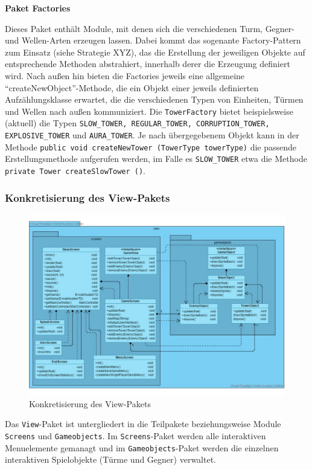 \documentclass[enabledeprecatedfontcommands,fontsize=12pt,paper=a4,twoside,parskip=half]{scrartcl}
\begin{document}
\textbf{Paket Factories}

Dieses Paket enthält Module, mit denen sich die verschiedenen Turm, Gegner- und Wellen-Arten erzeugen lassen. Dabei kommt das sogenante Factory-Pattern zum Einsatz (siehe Strategie XYZ), das die Erstellung der jeweiligen Objekte auf entsprechende Methoden abstrahiert, innerhalb derer die Erzeugung definiert wird. Nach außen hin bieten die Factories jeweils eine allgemeine \enquote{createNewObject}-Methode, die ein Objekt einer jeweils definierten  Aufzählungsklasse erwartet, die die verschiedenen Typen von Einheiten, Türmen und Wellen nach außen kommuniziert. Die \texttt{TowerFactory} bietet beispielsweise (aktuell) die Typen \texttt{SLOW\_TOWER, REGULAR\_TOWER, CORRUPTION\_TOWER, EXPLOSIVE\_TOWER} und  \texttt{AURA\_TOWER}. Je nach übergegebenem Objekt kann in der Methode \texttt{public void createNewTower (TowerType towerType)} die passende Erstellungsmethode aufgerufen werden, im Falle es \texttt{SLOW\_TOWER} etwa die Methode \texttt{private Tower createSlowTower ()}. 

\clearpage

\subsubsection{Konkretisierung des View-Pakets}
\begin{figure}[ht]
    \centering
    \includegraphics[width=\textwidth]{Bilder/KlassendiagramView.pdf}
    \caption{Konkretisierung des View-Pakets}
    \label{fig:viewPak}
\end{figure}
Das \texttt{View}-Paket ist untergliedert in die Teilpakete beziehungsweise Module \texttt{Screens} und \texttt{Gameobjects}. Im \texttt{Screens}-Paket werden alle interaktiven Menuelemente gemanagt und im \texttt{Gameobjects}-Paket werden die einzelnen interaktiven Spielobjekte (Türme und Gegner) verwaltet.
\end{document}
